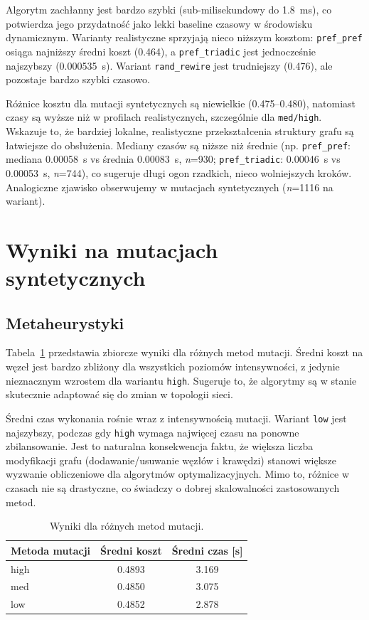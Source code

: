 Algorytm zachłanny jest bardzo szybki (sub-milisekundowy do \SI{1.8}{\ms}), co potwierdza jego przydatność jako lekki baseline czasowy w środowisku dynamicznym. Warianty realistyczne sprzyjają nieco niższym kosztom: \texttt{pref\_pref} osiąga najniższy średni koszt (0.464), a \texttt{pref\_triadic} jest jednocześnie najszybszy (\SI{0.000535}{\s}). Wariant \texttt{rand\_rewire} jest trudniejszy (0.476), ale pozostaje bardzo szybki czasowo.

Różnice kosztu dla mutacji syntetycznych są niewielkie (0.475--0.480), natomiast czasy są wyższe niż w profilach realistycznych, szczególnie dla \texttt{med/high}. Wskazuje to, że bardziej lokalne, realistyczne przekształcenia struktury grafu są łatwiejsze do obsłużenia. Mediany czasów są niższe niż średnie (np. \texttt{pref\_pref}: mediana \SI{0.00058}{\s} vs średnia \SI{0.00083}{\s}, \emph{n}=930; \texttt{pref\_triadic}: \SI{0.00046}{\s} vs \SI{0.00053}{\s}, \emph{n}=744), co sugeruje długi ogon rzadkich, nieco wolniejszych kroków. Analogiczne zjawisko obserwujemy w mutacjach syntetycznych (\emph{n}=1116 na wariant).

\section{Wyniki na mutacjach syntetycznych}
\subsection{Metaheurystyki}

Tabela~\ref{tab:dyn-synth-warm} przedstawia zbiorcze wyniki dla różnych metod mutacji. Średni koszt na węzeł jest bardzo zbliżony dla wszystkich poziomów intensywności, z jedynie nieznacznym wzrostem dla wariantu \texttt{high}. Sugeruje to, że algorytmy są w stanie skutecznie adaptować się do zmian w topologii sieci.

Średni czas wykonania rośnie wraz z intensywnością mutacji. Wariant \texttt{low} jest najszybszy, podczas gdy \texttt{high} wymaga najwięcej czasu na ponowne zbilansowanie. Jest to naturalna konsekwencja faktu, że większa liczba modyfikacji grafu (dodawanie/usuwanie węzłów i krawędzi) stanowi większe wyzwanie obliczeniowe dla algorytmów optymalizacyjnych. Mimo to, różnice w czasach nie są drastyczne, co świadczy o dobrej skalowalności zastosowanych metod.

\begin{table}[H]
  \centering
  \caption{Wyniki dla różnych metod mutacji.}
  \label{tab:dyn-synth-warm}
  \begin{tabular}{lcc}
    \toprule
    \textbf{Metoda mutacji} & \textbf{Średni koszt} & \textbf{Średni czas [s]} \\
    \midrule
    high                    & 0.4893                & 3.169                    \\
    med                     & 0.4850                & 3.075                    \\
    low                     & 0.4852                & 2.878                    \\
    \bottomrule
  \end{tabular}
\end{table}

